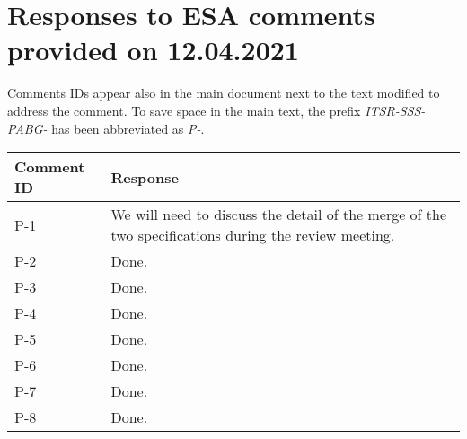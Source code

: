 
\section{Responses to ESA comments provided on 12.04.2021}
\label{sec:ESA:comments:1}

Comments IDs appear also in the main document next to the text modified to address the comment. To save space in the main text, the prefix \emph{ITSR-SSS-PABG-} has been abbreviated as \emph{P-}.

\setlength\LTleft{0pt}
\setlength\LTright{0pt}
\tiny 
\begin{longtable}{|p{1.5cm}|p{12cm}|@{}}
\textbf{Comment ID}&\textbf{Response}\\
\hline
P-1&
\begin{minipage}{12cm}
We will need to discuss the detail of the merge of the two specifications during the review meeting.
\end{minipage}\\
\hline

P-2&
\begin{minipage}{12cm}
Done.
\end{minipage}\\
\hline

P-3&
\begin{minipage}{12cm}
Done.
\end{minipage}\\
\hline

P-4&
\begin{minipage}{12cm}
Done.
\end{minipage}\\
\hline

P-5&
\begin{minipage}{12cm}
Done.
\end{minipage}\\
\hline

P-6&
\begin{minipage}{12cm}
Done.
\end{minipage}\\
\hline

P-7&
\begin{minipage}{12cm}
Done.
\end{minipage}\\
\hline

P-8&
\begin{minipage}{12cm}
Done.
\end{minipage}\\
\hline


\end{longtable}
